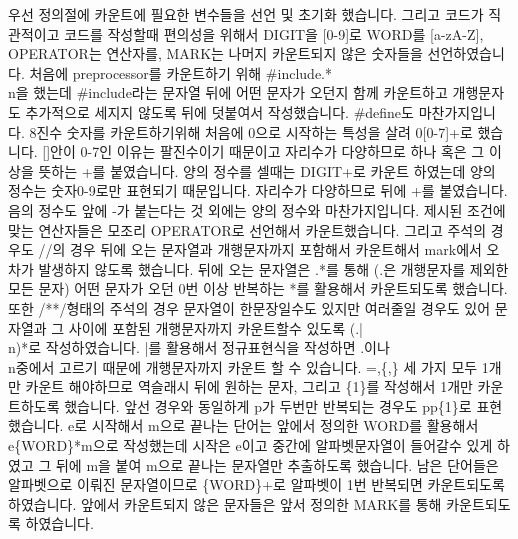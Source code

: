 \documentclass{article}
\begin{document}
\newpage
우선 정의절에 카운트에 필요한 변수들을 선언 및 초기화 했습니다. 그리고 코드가 직관적이고 코드를 작성할때 편의성을 위해서 DIGIT을 [0-9]로 WORD를 [a-zA-Z], OPERATOR는 연산자를, MARK는 나머지
카운트되지 않은 숫자들을 선언하였습니다. 처음에 preprocessor를 카운트하기 위해 \#include.*\\n을 했는데 \#include라는 문자열 뒤에 어떤 문자가 오던지 함께 카운트하고 개행문자도 추가적으로 세지지 않도록 뒤에 덧붙여서 작성했습니다. \#define도 마찬가지입니다. 8진수 숫자를 카운트하기위해 처음에 0으로 시작하는 특성을 살려 0[0-7]+로 했습니다. []안이 0-7인 이유는 팔진수이기 때문이고 자리수가 다양하므로 하나 혹은 그 이상을 뜻하는 +를 붙였습니다. 양의 정수를 셀때는 {DIGIT}+로 카운트 하였는데 양의 정수는 숫자0-9로만 표현되기 때문입니다. 자리수가 다양하므로 뒤에 +를 붙였습니다. 음의 정수도 앞에 -가 붙는다는 것 외에는 양의 정수와 마찬가지입니다. 제시된 조건에 맞는 연산자들은 모조리 OPERATOR로 선언해서 카운트했습니다. 그리고 주석의 경우도 //의 경우 뒤에 오는 문자열과 개행문자까지 포함해서 카운트해서 mark에서 오차가 발생하지 않도록 했습니다. 뒤에 오는 문자열은 .*를 통해 (.은 개행문자를 제외한 모든 문자) 어떤 문자가 오던 0번 이상 반복하는 *를 활용해서 카운트되도록 했습니다. 또한 /**/형태의 주석의 경우 문자열이 한문장일수도 있지만 여러줄일 경우도 있어 문자열과 그 사이에 포함된 개행문자까지 카운트할수 있도록 (.|\\n)*로 작성하였습니다. |를 활용해서 정규표현식을 작성하면 .이나 \\n중에서 고르기 때문에 개행문자까지 카운트 할 수 있습니다. =,\{,\} 세 가지 모두 1개만 카운트 해야하므로 역슬래시 뒤에 원하는 문자, 그리고 \{1\}를 작성해서 1개만 카운트하도록 했습니다. 앞선 경우와 동일하게 p가 두번만 반복되는 경우도 pp\{1\}로 표현했습니다. e로 시작해서 m으로 끝나는 단어는 앞에서 정의한 WORD를 활용해서 e\{WORD\}*m으로 작성했는데 시작은 e이고 중간에 알파벳문자열이 들어갈수 있게 하였고 그 뒤에 m을 붙여 m으로 끝나는 문자열만 추출하도록 했습니다. 남은 단어들은 알파벳으로 이뤄진 문자열이므로 \{WORD\}+로 알파벳이 1번 반복되면 카운트되도록 하였습니다. 앞에서 카운트되지 않은 문자들은 앞서 정의한 MARK를 통해 카운트되도록 하였습니다.
\end{document}

